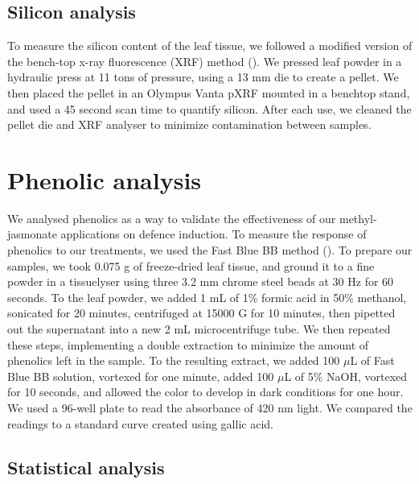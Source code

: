 \documentclass[12pt, letterpaper, ]{report}
\begin{document}
\subsection{Silicon analysis}

To measure the silicon content of the leaf tissue, we followed a modified version of the bench-top x-ray fluorescence (XRF) method (\cite{reidinger_rapid_2012}). We pressed leaf powder in a hydraulic press at 11 tons of pressure, using a 13 mm die to create a pellet. We then placed the pellet in an Olympus Vanta pXRF mounted in a benchtop stand, and used a 45 second scan time to quantify silicon. After each use, we cleaned the pellet die and XRF analyser to minimize contamination between samples.

\section{Phenolic analysis}

We analysed phenolics as a way to validate the effectiveness of our methyl-jasmonate applications on defence induction. To measure the response of phenolics to our treatments, we used the Fast Blue BB method (\cite{pico2020systematic}). To prepare our samples, we took 0.075 g of freeze-dried leaf tissue, and ground it to a fine powder in a tissuelyser using three 3.2 mm chrome steel beads at 30 Hz for 60 seconds. To the leaf powder, we added 1 mL of 1\% formic acid in 50\% methanol, sonicated for 20 minutes, centrifuged at 15000 G for 10 minutes, then pipetted out the supernatant into a new 2 mL  microcentrifuge tube. We then repeated these steps, implementing a double extraction to minimize the amount of phenolics left in the sample. To the resulting extract, we added 100 $\mu$L of Fast Blue BB solution, vortexed for one minute, added 100 $\mu$L of 5\% NaOH, vortexed for 10 seconds, and allowed the color to develop in dark conditions for one hour. We used a 96-well plate to read the absorbance of 420 nm light. We compared the readings to a standard curve created using gallic acid. 

\subsection{Statistical analysis}
\end{document}
